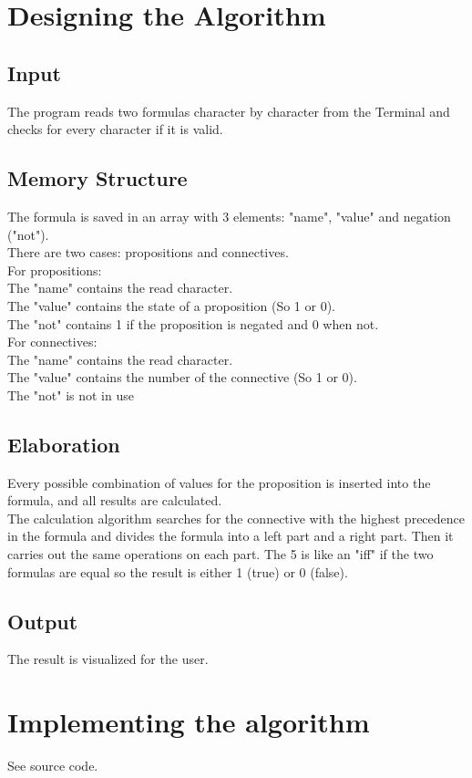 \documentclass[11pt, a4paper, titlepage, block]{article}
\begin{document}
	\newpage			
\section{Designing the Algorithm}
	\subsection{Input}
	The program reads two formulas character by character from the Terminal and checks for every character if it is valid.
	
	\subsection{Memory Structure}
		The formula is saved in an array with 3 elements: "name", "value" and negation ("not").\\
		There are two cases: propositions and connectives.\\
		For propositions:\\
		The "name" contains the read character. \\
		The "value" contains the state of a proposition (So 1 or 0).\\
		The "not" contains 1 if the proposition is negated and 0 when not.\\
		For connectives:\\
		The "name" contains the read character. \\
		The "value" contains the number of the connective  (So 1 or 0).\\
		The "not" is not in use
	\subsection{Elaboration}
	Every possible combination of values for the proposition is inserted into the formula, and all results are calculated.\\
	The calculation algorithm searches for the connective with the highest precedence in the formula and divides the formula into a left part and a right part. Then it carries out the same operations on each part.
	The 5 is like an "iff" if the two formulas are equal so the result is either 1 (true) or 0 (false). 
	\subsection{Output}
	The result is visualized for the user.
	\newpage
\section{Implementing the algorithm}
	See source code.
\end{document}
